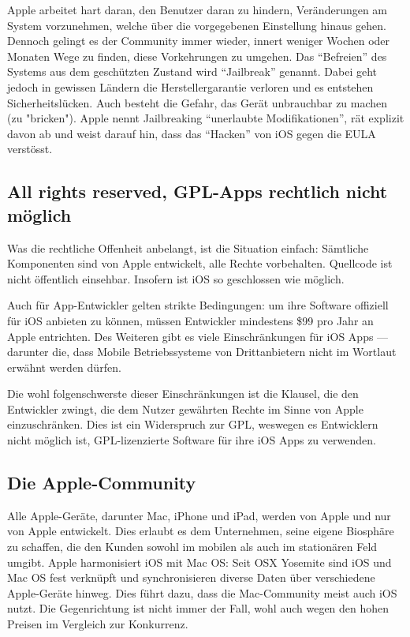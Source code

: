 Apple arbeitet hart daran, den Benutzer daran zu hindern, Veränderungen am System vorzunehmen, welche über die vorgegebenen Einstellung hinaus gehen. Dennoch gelingt es der Community immer wieder, innert weniger Wochen oder Monaten Wege zu finden, diese Vorkehrungen zu umgehen. Das ``Befreien'' des Systems aus dem geschützten Zustand wird ``Jailbreak'' genannt\thinspace\cite{online:ios-jailbreak}. Dabei geht jedoch in gewissen Ländern die Herstellergarantie verloren und es entstehen Sicherheitslücken. Auch besteht die Gefahr, das Gerät unbrauchbar zu machen (zu "bricken")\thinspace\cite{online:ios-whyjailbreak}. Apple nennt Jailbreaking ``unerlaubte Modifikationen'', rät explizit davon ab und weist darauf hin, dass das ``Hacken'' von iOS gegen die EULA verstösst\thinspace\cite{online:ios-dontjailbreak}.
\newline

\subsection{All rights reserved, GPL-Apps rechtlich nicht möglich}
Was die rechtliche Offenheit anbelangt, ist die Situation einfach: Sämtliche Komponenten sind von Apple entwickelt, alle Rechte vorbehalten. Quellcode ist nicht öffentlich einsehbar. Insofern ist iOS so geschlossen wie möglich.

Auch für \mbox{App-Entwickler} gelten strikte Bedingungen: um ihre Software offiziell für iOS anbieten zu können, müssen Entwickler mindestens \$99 pro Jahr an Apple entrichten\thinspace\cite{online:ios-appstore}. Des Weiteren gibt es viele Einschränkungen für iOS Apps --- darunter die, dass Mobile Betriebssysteme von Drittanbietern nicht im Wortlaut erwähnt werden dürfen\thinspace\cite{online:ios-guidelines}.

Die wohl folgenschwerste dieser Einschränkungen ist die Klausel, die den Entwickler zwingt, die dem Nutzer gewährten Rechte im Sinne von Apple einzuschränken\thinspace\cite{online:ios-terms}. Dies ist ein Widerspruch zur GPL, weswegen es Entwicklern nicht möglich ist, \mbox{GPL-lizenzierte} Software für ihre iOS Apps zu verwenden\thinspace\cite{online:ios-gpl}.
\newline

\subsection{Die Apple-Community}
Alle Apple-Geräte, darunter Mac, iPhone und iPad, werden von Apple und nur von Apple entwickelt. Dies erlaubt es dem Unternehmen, seine eigene Biosphäre zu schaffen, die den Kunden sowohl im mobilen als auch im stationären Feld umgibt. Apple harmonisiert iOS mit Mac OS: Seit OS\thinspace X Yosemite sind iOS und Mac OS fest verknüpft und synchronisieren diverse Daten über verschiedene \mbox{Apple-Geräte} hinweg. Dies führt dazu, dass die \mbox{Mac-Community} meist auch iOS nutzt. Die Gegenrichtung ist nicht immer der Fall, wohl auch wegen den hohen Preisen im Vergleich zur Konkurrenz.

